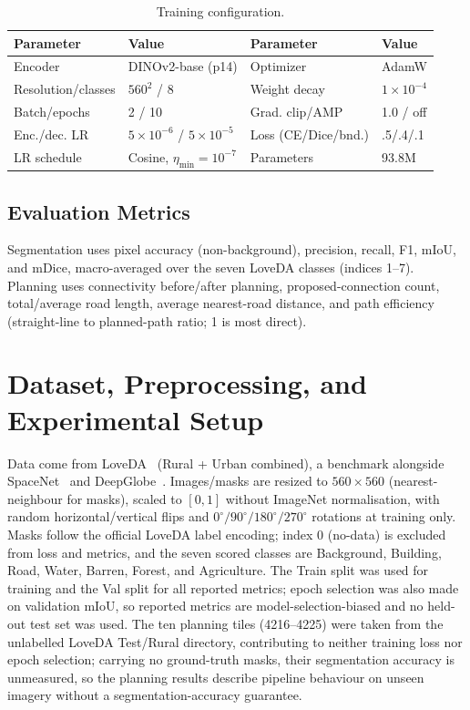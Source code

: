 \documentclass[runningheads]{llncs}
\begin{document}
\begin{table}[!htbp]
\caption{Training configuration.}\label{tab:train}
\centering\footnotesize
\begin{tabular}{llll}
\toprule
Parameter & Value & Parameter & Value\\
\midrule
Encoder & DINOv2-base (p14) & Optimizer & AdamW\\
Resolution/classes & $560^2$ / 8 & Weight decay & $1\times10^{-4}$\\
Batch/epochs & 2 / 10 & Grad. clip/AMP & 1.0 / off\\
Enc./dec. LR & $5\times10^{-6}$ / $5\times10^{-5}$ & Loss (CE/Dice/bnd.) & .5/.4/.1\\
LR schedule & Cosine, $\eta_{\min}=10^{-7}$ & Parameters & 93.8M\\
\bottomrule
\end{tabular}
\end{table}

\subsection{Evaluation Metrics}
Segmentation uses pixel accuracy (non-background), precision, recall, F1, mIoU, and mDice, macro-averaged over the seven LoveDA classes (indices 1--7). Planning uses connectivity before/after planning, proposed-connection count, total/average road length, average nearest-road distance, and path efficiency (straight-line to planned-path ratio; 1 is most direct).

\section{Dataset, Preprocessing, and Experimental Setup}\label{sec:setup}
Data come from LoveDA~\cite{wang2021loveda} (Rural + Urban combined), a benchmark alongside SpaceNet~\cite{vanetten2018} and DeepGlobe~\cite{demir2018}. Images/masks are resized to $560\times560$ (nearest-neighbour for masks), scaled to $[0,1]$ without ImageNet normalisation, with random horizontal/vertical flips and $0^\circ/90^\circ/180^\circ/270^\circ$ rotations at training only. Masks follow the official LoveDA label encoding; index 0 (no-data) is excluded from loss and metrics, and the seven scored classes are Background, Building, Road, Water, Barren, Forest, and Agriculture. The Train split was used for training and the Val split for all reported metrics; epoch selection was also made on validation mIoU, so reported metrics are model-selection-biased and no held-out test set was used. The ten planning tiles (4216--4225) were taken from the unlabelled LoveDA Test/Rural directory, contributing to neither training loss nor epoch selection; carrying no ground-truth masks, their segmentation accuracy is unmeasured, so the planning results describe pipeline behaviour on unseen imagery without a segmentation-accuracy guarantee.
\end{document}
